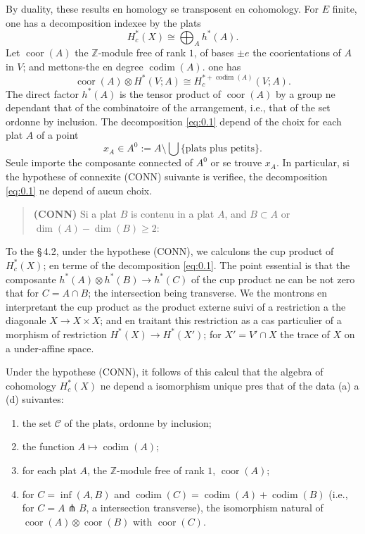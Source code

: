 \documentclass[11pt,a4paper]{article}
\theoremstyle{plain}
\theoremstyle{definition}
\DeclareMathOperator{\codim}{codim}
\newcommand{\coor}{\operatorname{coor}}
\begin{document}
By duality, these results en homology se transposent en cohomology. For $E$ finite, one has a decomposition indexee by the plats
\begin{equation}\label{eq:0.1}
H^*_c(X) \cong \bigoplus_A h^*(A).
\tag{0.1}
\end{equation}
Let $\coor(A)$ the $\mathbb{Z}$-module free of rank $1$, of bases $\pm e$ the coorientations of $A$ in $V$; and mettons-the en degree $\codim(A)$. one has
\begin{equation}\label{eq:0.2}
\coor(A) \otimes H^*(V;A) \cong H^{*+\codim(A)}_c(V;A).
\tag{0.2}
\end{equation}
The direct factor $h^*(A)$ is the tensor product of $\coor(A)$ by a group ne dependant that of the combinatoire of the arrangement, i.e., that of the set ordonne by inclusion. The decomposition \eqref{eq:0.1} depend of the choix for each plat $A$ of a point
\[
x_A \in A^0 := A \setminus \bigcup\{\text{plats plus petits}\}.
\]
Seule importe the composante connected of $A^0$ or se trouve $x_A$. In particular, si the hypothese of connexite (CONN) suivante is verifiee, the decomposition \eqref{eq:0.1} ne depend of aucun choix.

\begin{quote}
\textbf{(CONN)} \quad Si a plat $B$ is contenu in a plat $A$, and $B \subset A$ or $\dim(A) - \dim(B) \geq 2$:
\end{quote}

To the \S\,4.2, under the hypothese (CONN), we calculons the cup product of $H^*_c(X)$; en terme of the decomposition \eqref{eq:0.1}. The point essential is that the composante $h^*(A) \otimes h^*(B) \to h^*(C)$ of the cup product ne can be not zero that for $C = A \cap B$; the intersection being transverse. We the montrons en interpretant the cup product as the product externe suivi of a restriction a the diagonale $X \to X \times X$; and en traitant this restriction as a cas particulier of a morphism of restriction $H^*(X) \to H^*(X')$; for $X' = V' \cap X$ the trace of $X$ on a under-affine space.

Under the hypothese (CONN), it follows of this calcul that the algebra of cohomology $H^*_c(X)$ ne depend a isomorphism unique pres that of the data (a) a (d) suivantes:
\begin{enumerate}[label=(\alph*)]
\item the set $\mathcal{C}$ of the plats, ordonne by inclusion;
\item the function $A \mapsto \codim(A)$;
\item for each plat $A$, the $\mathbb{Z}$-module free of rank $1$, $\coor(A)$;
\item for $C = \inf(A,B)$ and $\codim(C) = \codim(A) + \codim(B)$ (i.e., for $C = A \pitchfork B$, a intersection transverse), the isomorphism natural of $\coor(A) \otimes \coor(B)$ with $\coor(C)$.
\end{enumerate}
\end{document}
